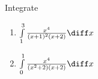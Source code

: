 Integrate 
\begin{enumerate}
\item $\int\limits_{1}^3 \frac{x^4 }{(x+1)^2(x+2) } \diff x$
\item $\int\limits_{0}^1 \frac{x^4 }{(x^2+2)(x+2) } \diff x$
\end{enumerate}
